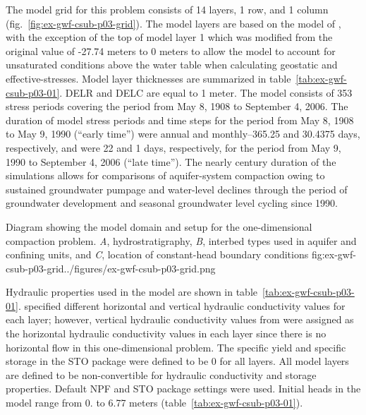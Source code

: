 The model grid for this problem consists of 14 layers, 1 row, and 1 column (fig.~\ref{fig:ex-gwf-csub-p03-grid}). The model layers are based on the model of \cite{sneed2008}, with the exception of the top of model layer 1 which was modified from the original value of -27.74 meters to 0 meters to allow the model to account for unsaturated conditions above the water table when calculating geostatic and effective-stresses. Model layer thicknesses are summarized in table~\ref{tab:ex-gwf-csub-p03-01}. DELR and DELC are equal to 1 meter. The model consists of 353 stress periods covering the period from May 8, 1908 to September 4, 2006. The duration of model stress periods and time steps for the period from May 8, 1908 to May 9, 1990 (“early time”) were annual and monthly--365.25 and 30.4375 days, respectively, and were 22 and 1 days, respectively, for the period from May 9, 1990 to September 4, 2006 (“late time”). The nearly century duration of the simulations allows for comparisons of aquifer-system compaction owing to sustained groundwater pumpage and water-level declines through the period of groundwater development and seasonal groundwater level cycling since 1990.

\begin{StandardFigure}{
                                      Diagram showing the model domain and setup for the one-dimensional 
                                      compaction problem. \textit{A}, hydrostratigraphy, \textit{B}, interbed types 
                                      used in aquifer and confining units, and \textit{C}, location of constant-head 
                                      boundary conditions
                                     }{fig:ex-gwf-csub-p03-grid}{../figures/ex-gwf-csub-p03-grid.png}
\end{StandardFigure}        

 

Hydraulic properties used in the model are shown in table~\ref{tab:ex-gwf-csub-p03-01}.  \cite{sneed2008} specified different horizontal and vertical hydraulic conductivity values for each layer; however, vertical hydraulic conductivity values from \cite{sneed2008} were assigned as the horizontal hydraulic conductivity values in each layer since there is no horizontal flow in this one-dimensional problem. The specific yield and specific storage in the STO package were defined to be 0 for all layers.  All model layers are defined to be non-convertible for hydraulic conductivity and storage properties. Default NPF and STO package settings were used. Initial heads in the model range from 0. to 6.77 meters (table~\ref{tab:ex-gwf-csub-p03-01}).

